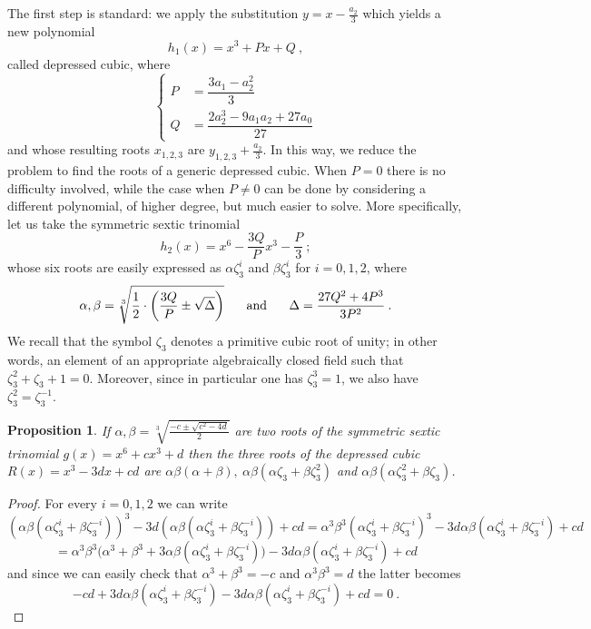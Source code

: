 \documentclass[11pt,a4paper]{article}
\numberwithin{equation}{section}
\newtheorem{prop}[teo]{Proposition}
\theoremstyle{definition}
\begin{document}
The first step is standard: we apply the substitution $y=x-\frac{a_2}{3}$ which yields a new polynomial \[h_1(x)=x^3+Px+Q\:,\] called depressed cubic, where \[\left\{\begin{aligned}
   P&=\dfrac{3a_1-a_2^2}{3}  \\
   Q&=\dfrac{2a_2^3-9a_1a_2+27a_0}{27}
\end{aligned}\right.\]
and whose resulting roots $x_{1,2,3}$ are $y_{1,2,3}+\frac{a_2}{3}$. In this way, we reduce the problem to find the roots of a generic depressed cubic. When $P=0$ there is no difficulty involved, while the case when $P\neq0$ can be done by considering a different polynomial, of higher degree, but much easier to solve. More specifically, let us take the symmetric sextic trinomial \[h_2(x)=x^6-\dfrac{3Q}{P}x^3-\dfrac{P}{3}\:;\] whose six roots are easily expressed as $\alpha\zeta_3^i$ and $\beta\zeta_3^i$ for $i=0,1,2$, where \begin{equation}\alpha,\beta=\sqrt[3]{\dfrac{1}{2}\cdot\left(\dfrac{3Q}{P}\pm\sqrt\Delta\right)}\hspace{0.5cm}\text{ and }\hspace{0.5cm}\Delta=\dfrac{27Q^2+4P^3}{3P^2}\:.\label{eq:depressed}
\end{equation}
We recall that the symbol $\zeta_3$ denotes a primitive cubic root of unity; in other words, an element of an appropriate algebraically closed field such that $\zeta_3^2+\zeta_3+1=0$. Moreover, since in particular one has $\zeta_3^3=1$, we also have $\zeta_3^2=\zeta_3^{-1}$.
\begin{prop}
 \label{prop:depressed}
 If $\alpha,\beta=\sqrt[3]{\frac{-c\pm\sqrt{c^2-4d}}{2}}$ are two roots of the symmetric sextic trinomial $g(x)=x^6+cx^3+d$ then the three roots of the depressed cubic $R(x)=x^3-3dx+cd$ are $\alpha\beta(\alpha+\beta),\:\alpha\beta(\alpha\zeta_3+\beta\zeta_3^2)$ and $\alpha\beta(\alpha\zeta_3^2+\beta\zeta_3)$. 
\end{prop}
\begin{proof}
 For every $i=0,1,2$ we can write \[(\alpha\beta(\alpha\zeta_3^i+\beta\zeta_3^{-i}))^3-3d(\alpha\beta(\alpha\zeta_3^i+\beta\zeta_3^{-i}))+cd=\alpha^3\beta^3(\alpha\zeta_3^i+\beta\zeta_3^{-i})^3-3d\alpha\beta(\alpha\zeta_3^i+\beta\zeta_3^{-i})+cd\]   
 \[=\alpha^3\beta^3\big(\alpha^3+\beta^3+3\alpha\beta(\alpha\zeta_3^{i}+\beta\zeta_3^{-i})\big)-3d\alpha\beta(\alpha\zeta_3^i+\beta\zeta_3^{-i})+cd\]
 and since we can easily check that $\alpha^3+\beta^3=-c$ and $\alpha^3\beta^3=d$ the latter becomes \[-cd+3d\alpha\beta(\alpha\zeta_3^{i}+\beta\zeta_3^{-i})-3d\alpha\beta(\alpha\zeta_3^{i}+\beta\zeta_3^{-i})+cd=0\:.\]
\end{proof}
\end{document}
